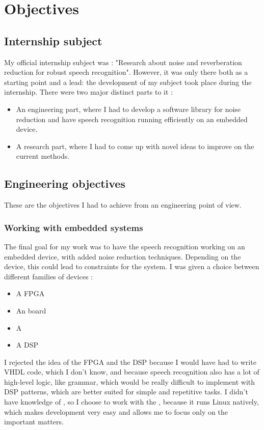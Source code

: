 \chapter{Objectives}
\section{Internship subject}
My official internship subject was : "Research about noise and reverberation reduction for robust speech recognition".
However, it was only there both as a starting point and a lead: the development of my subject took place during the internship.
There were two major distinct parts to it :
\begin{itemize}
\item An engineering part, where I had to develop a software library for noise reduction and have speech recognition running efficiently on an embedded device.
\item A research part, where I had to come up with novel ideas to improve on the current methods.
\end{itemize}


\section{Engineering objectives}
These are the objectives I had to achieve from an engineering point of view.
\subsection{Working with embedded systems}
The final goal for my work was to have the speech recognition working on an embedded device, with added noise reduction techniques.
Depending on the device, this could lead to constraints for the system.
I was given a choice between different families of devices : 
\begin{itemize}
\item A \ac{FPGA}
\item An  board
\item A 
\item A \ac{DSP}
\end{itemize}
I rejected the idea of the \ac{FPGA} and the \ac{DSP} because I would have had to write \ac{VHDL} code, which I don't know, and because speech recognition also has a lot of high-level logic, like grammar, which would be really difficult to implement with \ac{DSP} patterns, which are better suited for simple and repetitive tasks.
I didn't have knowledge of , so I choose to work with the , because it runs Linux natively, which makes development very easy and allows me to focus only on the important matters.

